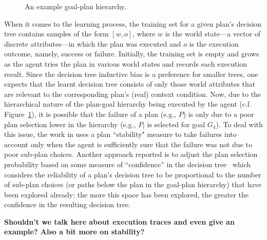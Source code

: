 \begin{figure}[t]
\begin{center}

\end{center}
\caption{An example goal-plan hierarchy.}
\label{fig:confidence}
\end{figure}

When it comes to the learning process, the training set for a given plan's decision tree contains samples of the form $[w, o]$, where $w$ is the world state---a vector of discrete attributes---in which the plan was executed and $o$ is the execution outcome, namely, success or failure. Initially, the training set is empty and grows as the agent tries the plan in various world states and records each execution result. 
Since the decision tree inductive bias is a preference for smaller trees, one expects that the learnt decision tree consists of only those world attributes that are relevant to the corresponding plan's (real) context condition.
Now, due to the hierarchical nature of the plan-goal hierarchy being executed by the agent (c.f. Figure~\ref{fig:confidence}), it is possible that the failure of a plan (e.g., $P$) is only due to a poor plan selection lower in the hierarchy (e.g., $P_l$ is selected for goal $G_4$).
To deal with this issue, the work in \cite{airiau09:enhancing} uses a plan ``stability" measure to take failures into account only when the agent is sufficiently sure that the failure was not due to poor sub-plan choices. Another approach reported is to adjust the plan selection probability based on some measure of ``confidence'' in the decision tree~\cite{singh10:extending,singh10:learning} which considers the reliability of a plan's decision tree to be proportional to the number of sub-plan choices (or paths below the plan in the goal-plan hierarchy) that have been explored already: the more this space has been explored, the greater the confidence in the resulting decision tree. 



\textbf{Shouldn't we talk here about execution traces and even give an example? Also a bit more on stability?}  

